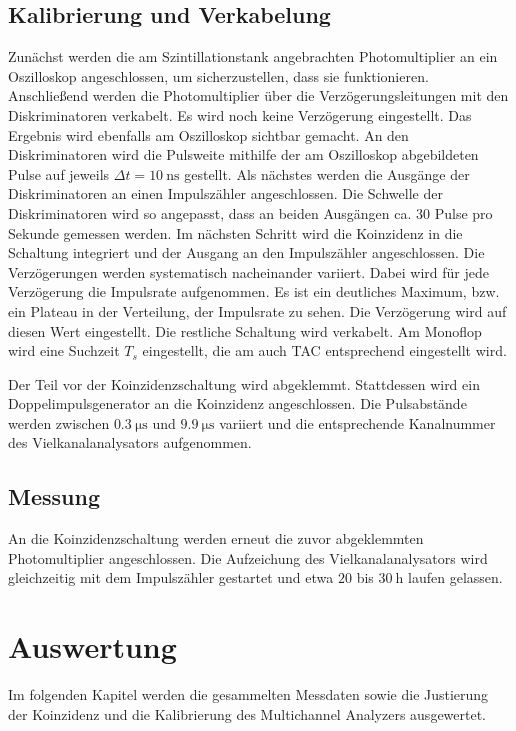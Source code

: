 \subsection{Kalibrierung und Verkabelung}
Zunächst werden die am Szintillationstank angebrachten Photomultiplier an ein Oszilloskop angeschlossen, um sicherzustellen, dass sie funktionieren.
Anschließend werden die Photomultiplier über die Verzögerungsleitungen mit den Diskriminatoren verkabelt. Es wird noch keine Verzögerung eingestellt. Das Ergebnis wird ebenfalls am Oszilloskop sichtbar gemacht. An den Diskriminatoren wird die Pulsweite mithilfe der am Oszilloskop abgebildeten Pulse auf jeweils $\Delta t = \SI{10}{\nano\second}$ gestellt.
Als nächstes werden die Ausgänge der Diskriminatoren an einen Impulszähler angeschlossen. Die Schwelle der Diskriminatoren wird so angepasst, dass an beiden Ausgängen ca. $\num{30}$ Pulse pro Sekunde gemessen werden.
Im nächsten Schritt wird die Koinzidenz in die Schaltung integriert und der Ausgang an den Impulszähler angeschlossen. Die Verzögerungen werden systematisch nacheinander variiert. Dabei wird für jede Verzögerung die Impulsrate aufgenommen. Es ist ein deutliches Maximum, bzw. ein Plateau in der Verteilung, der Impulsrate zu sehen. Die Verzögerung wird auf diesen Wert eingestellt.
Die restliche Schaltung wird verkabelt. 
Am Monoflop wird eine Suchzeit $T_s$ eingestellt, die am auch TAC entsprechend eingestellt wird.

Der Teil vor der Koinzidenzschaltung wird abgeklemmt. Stattdessen wird ein Doppelimpulsgenerator an die Koinzidenz angeschlossen.
Die Pulsabstände werden zwischen $\SI{0.3}{\micro\second}$ und $\SI{9.9}{\micro\second}$ variiert und die entsprechende Kanalnummer des Vielkanalanalysators aufgenommen.

\subsection{Messung}
An die Koinzidenzschaltung werden erneut die zuvor abgeklemmten Photomultiplier angeschlossen. Die Aufzeichung des Vielkanalanalysators wird gleichzeitig mit dem Impulszähler gestartet und etwa $\num{20}$ bis $\SI{30}{\hour}$ laufen gelassen. %

\newpage
\section{Auswertung}
Im folgenden Kapitel werden die gesammelten Messdaten sowie die Justierung der Koinzidenz und 
die Kalibrierung des Multichannel Analyzers ausgewertet.


